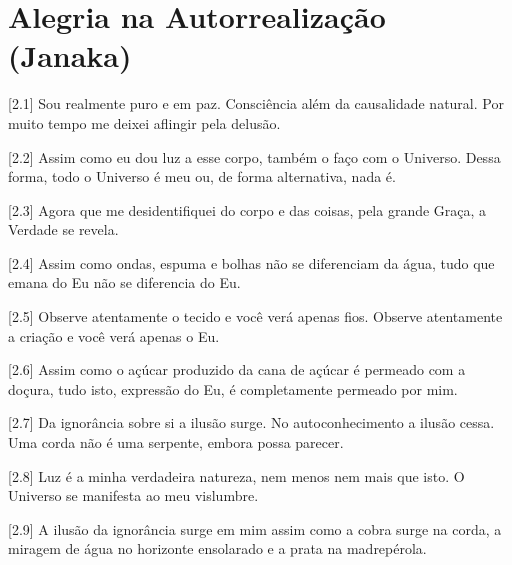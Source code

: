 \chapter[(Janaka)]{Alegria na Autorrealização (Janaka)}

[2.1] Sou realmente puro e em paz. Consciência além da causalidade natural. Por muito tempo me deixei aflingir pela delusão.

[2.2] Assim como eu dou luz a esse corpo, também o faço com o Universo. Dessa forma, todo o Universo é meu ou, de forma alternativa, nada é.

[2.3] Agora que me desidentifiquei do corpo e das coisas, pela grande Graça, a Verdade se revela.

[2.4] Assim como ondas, espuma e bolhas não se diferenciam da água, tudo que emana do Eu não se diferencia do Eu.

[2.5] Observe atentamente o tecido e você verá apenas fios. Observe atentamente a criação e você verá apenas o Eu.

[2.6] Assim como o açúcar produzido da cana de açúcar é permeado com a doçura, tudo isto, expressão do Eu, é completamente permeado por mim.

[2.7] Da ignorância sobre si a ilusão surge. No autoconhecimento a ilusão cessa. Uma corda não é uma serpente, embora possa parecer.

[2.8] Luz é a minha verdadeira natureza, nem menos nem mais que isto. O Universo se manifesta ao meu vislumbre.

[2.9] A ilusão da ignorância surge em mim assim como a cobra surge na corda, a miragem de água no horizonte ensolarado e a prata na madrepérola.
